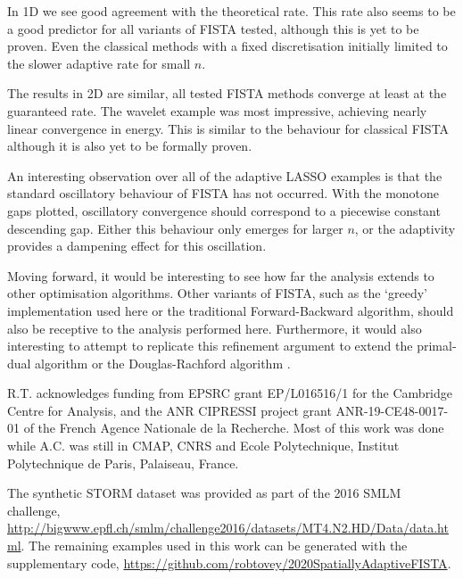 \documentclass[smallextended]{svjour3}
\newenvironment{dataavailability}{\begin{datav}}
	{\end{datav}}
\newcommand{\1}{\F{1}}
\newcommand{\edit}[3][1]{%
	\IfEq{#1}{2}{\def\mysecondvar{}}{\def\mysecondvar{#2}}%
	\ifx\mysecondvar\empty{}\else{%
		\IfEq{#1}{1}{%
			\ifmmode%
			\text{\color{red}\sout{\ensuremath{#2}}}%
			\else%
			{\color{red} \sout{#2}}%
			\fi%
		}{\color{red}#2}\ %
	}\fi{\color{darkgreen}#3}}
\begin{document}
	In 1D we see good agreement with the theoretical rate. This rate also seems to be a good predictor for all variants of FISTA tested, although this is yet to be proven. Even the classical methods with a fixed discretisation\edit{}{ are} initially\edit{ seem}{} limited to the slower adaptive rate for small $n$.
	
	The results in 2D are similar, all tested FISTA methods converge at least at the guaranteed rate. The wavelet example was most impressive, achieving nearly linear convergence in energy. This is similar to the behaviour for classical FISTA although it is also yet to be formally proven.
	
	An interesting observation over all of the adaptive LASSO examples is that the standard oscillatory behaviour of FISTA has not occurred. With the monotone gaps plotted, oscillatory convergence should correspond to a piecewise constant descending gap. Either this behaviour only emerges for larger $n$, or the adaptivity provides a dampening effect for this oscillation.
	
	Moving forward, it would be interesting to see how far the analysis extends to other optimisation algorithms. Other variants of FISTA, such as the `greedy' implementation used here or the traditional Forward-Backward algorithm, should also be receptive to the analysis performed here. Furthermore, it would also interesting to attempt to replicate this refinement argument to extend the primal-dual algorithm \cite{Chambolle2011} or the Douglas-Rachford algorithm \cite{Douglas1956}.
	
	\begin{acknowledgements}
		R.T. acknowledges funding from EPSRC grant EP/L016516/1 for the Cambridge Centre for Analysis, and the ANR CIPRESSI project grant ANR-19-CE48-0017-01 of the French Agence Nationale de la Recherche. Most of this work was done while A.C. was still in CMAP, CNRS and Ecole Polytechnique, Institut Polytechnique de Paris, Palaiseau, France.
	\end{acknowledgements}

	\begin{dataavailability}
		The synthetic STORM dataset was provided as part of the 2016 SMLM challenge, \url{http://bigwww.epfl.ch/smlm/challenge2016/datasets/MT4.N2.HD/Data/data.html}. The remaining examples used in this work can be generated with the supplementary code, \url{https://github.com/robtovey/2020SpatiallyAdaptiveFISTA}.
	\end{dataavailability}
	
\end{document}
